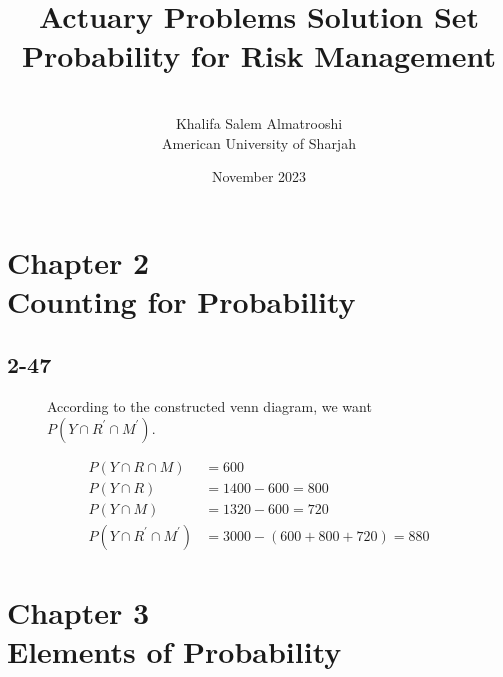 \documentclass{article}
\title{Actuary Problems Solution Set \\
	\Large Probability for Risk Management}
\author{\\Khalifa Salem Almatrooshi \\
	American University of Sharjah}
\date{November 2023}
\begin{document}
	\begin{titlepage}
		\maketitle
	\end{titlepage}

	\tableofcontents

	\clearpage


	\section[Chapter 2: Counting for Probability]{Chapter 2 \\
		Counting for Probability}

		\subsection*{2-47}

		\begin{figure}[!h]
			\centering
			 \par
			According to the constructed venn diagram, we want $P(Y \cap R^\prime \cap M^\prime)$.
		\end{figure}

		\begin{align*}
			P(Y \cap R \cap M) &= 600 \\
			P(Y \cap R) &= 1400 - 600 = 800 \\
			P(Y \cap M) &= 1320 - 600 = 720 \\
			P(Y \cap R^\prime \cap M^\prime) &= 3000 - (600 + 800 + 720) = \boxed{880}
		\end{align*}

	\clearpage

	\section[Chapter 3: Elements of Probability]{Chapter 3 \\
		Elements of Probability}
\end{document}
